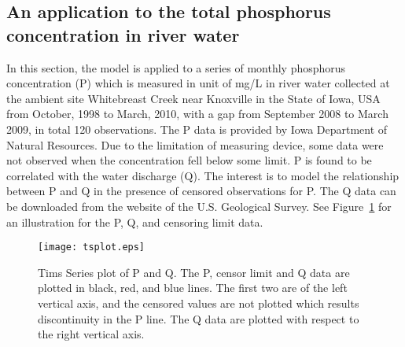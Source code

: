\documentclass[a4paper,12pt]{article}
\begin{document}
%
%
%


\newpage




\subsection{An application to the total phosphorus concentration in river water}
In this section, the model is applied to a series of monthly phosphorus concentration (P) which is
measured in unit of mg/L in river water collected at the ambient site Whitebreast Creek near Knoxville 
in the State of Iowa, USA from October, 1998 to March, 2010, with a gap from September
2008 to March 2009, in total 120 observations. The P data is provided by Iowa Department of Natural Resources. Due to the limitation of measuring device, some data were not observed when the
concentration fell below some limit. P is found to be correlated with the water discharge
(Q). The interest is to model the relationship between P and Q in the presence of censored observations for P. The Q data can be downloaded from the website of the U.S. Geological Survey. See Figure~\ref{fig:tsOrig} for an illustration for the P, Q, and censoring limit data.

\begin{figure}
\begin{center}
\texttt{[image: tsplot.eps]}
\end{center}
\caption{Tims Series plot of P and Q. The P, censor limit and Q data are plotted in black, red,
and blue lines. The first two are of the left vertical axis, and the censored values are not plotted which
results discontinuity in the P line. The Q data are plotted with respect to the right vertical axis.}
\label{fig:tsOrig}
\end{figure}

\end{document}
